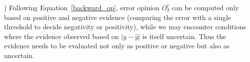 


) Following Equation~\ref{backward_op}, error opinion $O_{\delta}^l$ can be computed only based on positive and negative evidence (comparing the error with a single threshold to decide negativity or positivity), while we may encounter conditions where the evidence observed based on $|y-\hat{y}|$ is itself uncertain. Thus the evidence needs to be evaluated not only as positive or negative but also as uncertain. 

